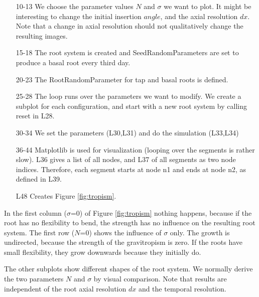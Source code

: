 \begin{itemize}
\item[10-13] We choose the parameter values $N$ and $\sigma$ we want to plot. It might be interesting to change the initial insertion $angle$, and the axial resolution $dx$. Note that a change in axial resolution should not qualitatively change the resulting images.

\item[15-18] The root system is created and SeedRandomParameters are set to produce a basal root every third day. 

\item[20-23] The RootRandomParameter for tap and basal roots is defined.

\item[25-28] The loop runs over the parameters we want to modify. We create a subplot for each configuration, and start with a new root system by calling reset in L28.

\item[30-34] We set the parameters (L30,L31) and do the simulation (L33,L34)

\item[36-44] Matplotlib is used for visualization (looping over the segments is rather slow). L36 gives a list of all nodes, and L37 of all segments as two node indices. Therefore, each segment starts at node n1 and ends at node n2, as defined in L39.

\item[L48] Creates Figure \ref{fig:tropism}.
\end{itemize}

In the first column ($\sigma$=0) of Figure \ref{fig:tropism} nothing happens, because if the root has no flexibility to bend, the strength has no influence on the resulting root system. The first row ($N$=0) shows the influence of $\sigma$ only. The growth is undirected, because the strength of the gravitropism is zero. If the roots have small flexibility, they grow downwards because they initially do. 

The other subplots show different shapes of the root system. We normally derive the two parameters $N$ and $\sigma$ by visual comparison. Note that results are independent of the root axial resolution $dx$ and the temporal resolution.
% 





